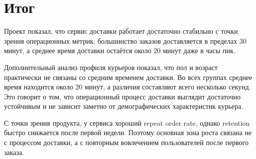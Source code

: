 \documentclass[12pt,a4paper]{article}
\begin{document}
\section{Итог}

Проект показал, что сервис доставки работает достаточно стабильно с точки зрения операционных метрик: большинство заказов доставляется в пределах 30 минут, а среднее время доставки остаётся около 20 минут даже в часы пик.

Дополнительный анализ профиля курьеров показал, что пол и возраст практически не связаны со средним временем доставки. Во всех группах среднее время находится около 20 минут, а различия составляют всего несколько секунд. Это говорит о том, что операционный процесс доставки выглядит достаточно устойчивым и не зависит заметно от демографических характеристик курьера.

С точки зрения продукта, у сервиса хороший repeat order rate, однако retention быстро снижается после первой недели. Поэтому основная зона роста связана не с процессом доставки, а с повторным вовлечением пользователей после первого заказа.
\end{document}
